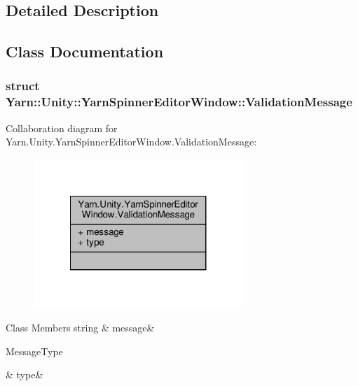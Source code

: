 \subsection{Detailed Description}


\subsection{Class Documentation}
\label{d9/d38/a00166}
\hypertarget{a00085_d9/d38/a00166}{}
\subsubsection{struct Yarn\-:\-:Unity\-:\-:Yarn\-Spinner\-Editor\-Window\-:\-:Validation\-Message}


Collaboration diagram for Yarn.\-Unity.\-Yarn\-Spinner\-Editor\-Window.\-Validation\-Message\-:
\nopagebreak
\begin{figure}[H]
\begin{center}
\leavevmode
\includegraphics[width=224pt]{dc/de6/a00167}
\end{center}
\end{figure}
\begin{DoxyFields}{Class Members}
\hypertarget{a00085_a636dce6708e779c201fa5e7d01cf2955}{string}\label{a00085_a636dce6708e779c201fa5e7d01cf2955}
&
message&
\\
\hline

\hypertarget{a00085_a7d342190c7657fbbe85eb6fa66bcabb8}{Message\-Type}\label{a00085_a7d342190c7657fbbe85eb6fa66bcabb8}
&
type&
\\
\hline

\end{DoxyFields}


